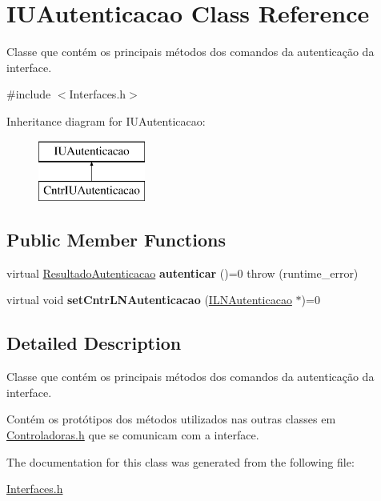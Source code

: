 \hypertarget{class_i_u_autenticacao}{}\section{I\+U\+Autenticacao Class Reference}
\label{class_i_u_autenticacao}


Classe que contém os principais métodos dos comandos da autenticação da interface.  




{\ttfamily \#include $<$Interfaces.\+h$>$}

Inheritance diagram for I\+U\+Autenticacao\+:\begin{figure}[H]
\begin{center}
\leavevmode
\includegraphics[height=2.000000cm]{class_i_u_autenticacao}
\end{center}
\end{figure}
\subsection*{Public Member Functions}
\begin{DoxyCompactItemize}
\item 
\hypertarget{class_i_u_autenticacao_ac963b141bda437bfd3ac425e9e6b9898}{}\label{class_i_u_autenticacao_ac963b141bda437bfd3ac425e9e6b9898} 
virtual \hyperlink{class_resultado_autenticacao}{Resultado\+Autenticacao} {\bfseries autenticar} ()=0  throw (runtime\+\_\+error)
\item 
\hypertarget{class_i_u_autenticacao_afaa4e4980ee10e2faaecb9ccfe524c61}{}\label{class_i_u_autenticacao_afaa4e4980ee10e2faaecb9ccfe524c61} 
virtual void {\bfseries set\+Cntr\+L\+N\+Autenticacao} (\hyperlink{class_i_l_n_autenticacao}{I\+L\+N\+Autenticacao} $\ast$)=0
\end{DoxyCompactItemize}


\subsection{Detailed Description}
Classe que contém os principais métodos dos comandos da autenticação da interface. 

Contém os protótipos dos métodos utilizados nas outras classes em \hyperlink{_controladoras_8h}{Controladoras.\+h} que se comunicam com a interface. 

The documentation for this class was generated from the following file\+:\begin{DoxyCompactItemize}
\item 
\hyperlink{_interfaces_8h}{Interfaces.\+h}\end{DoxyCompactItemize}
